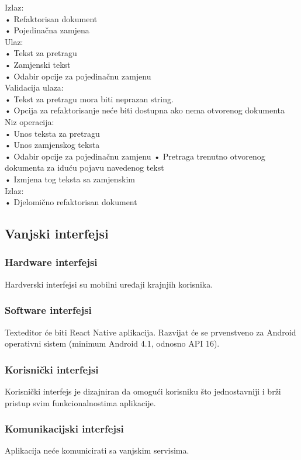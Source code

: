 \documentclass[utf8]{article}
\begin{document}
Izlaz:\\
•	Refaktorisan dokument\\
•	Pojedinačna zamjena\\
       Ulaz:\\
•	Tekst za pretragu \\
•	Zamjenski tekst\\
•	Odabir opcije za pojedinačnu zamjenu \\
Validacija ulaza:\\
•	Tekst za pretragu mora biti neprazan string. \\
•	Opcija za refaktorisanje neće biti dostupna ako nema otvorenog dokumenta\\
Niz operacija:\\
•	Unos teksta za pretragu \\
•	Unos zamjenskog teksta \\
•	Odabir opcije za pojedinačnu zamjenu 
•	Pretraga trenutno otvorenog dokumenta za iduću pojavu navedenog tekst \\
•	Izmjena tog teksta sa zamjenskim \\
Izlaz:\\
•	Djelomično refaktorisan dokument\\

\subsection{Vanjski interfejsi}
\subsubsection{Hardware interfejsi}
Hardverski interfejsi su mobilni uređaji krajnjih korisnika.
\subsubsection{Software interfejsi}
Texteditor će biti React Native aplikacija. Razvijat će se prvenstveno za Android operativni sistem (minimum Android 4.1, odnosno API 16).
\subsubsection{Korisnički interfejsi}
Korisnički interfejs je dizajniran da omogući korisniku što jednostavniji i brži pristup svim funkcionalnostima aplikacije.
\subsubsection{Komunikacijski interfejsi}
Aplikacija neće komunicirati sa vanjskim servisima.
\end{document}

